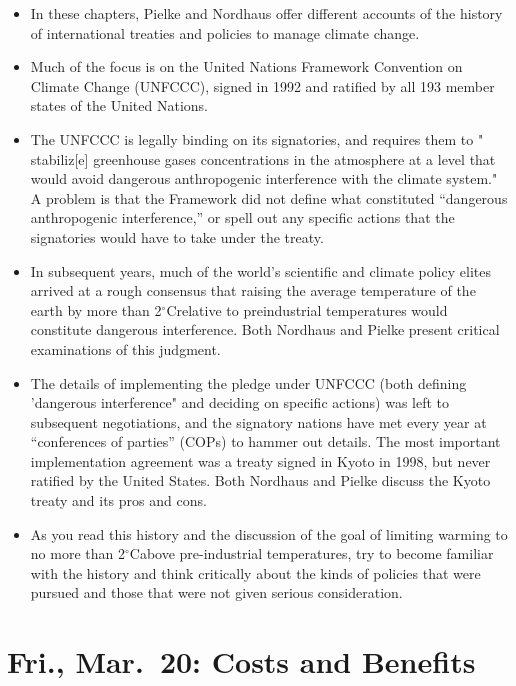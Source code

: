 \documentclass[
]{article}
\providecommand{\tightlist}{%
  \setlength{\itemsep}{0pt}\setlength{\parskip}{0pt}}
\newcommand{\degC}{\ensuremath{^\circ \mathrm{C}}}
\begin{document}
\begin{itemize}
\tightlist
\item
  In these chapters, Pielke and Nordhaus offer different accounts of the
  history of international treaties and policies to manage climate
  change.
\item
  Much of the focus is on the United Nations Framework Convention on
  Climate Change (UNFCCC), signed in 1992 and ratified by all 193 member
  states of the United Nations.
\item
  The UNFCCC is legally binding on its signatories, and requires them to
  " stabiliz{[}e{]} greenhouse gases concentrations in the atmosphere at
  a level that would avoid dangerous anthropogenic interference with the
  climate system." A problem is that the Framework did not define what
  constituted ``dangerous anthropogenic interference,'' or spell out any
  specific actions that the signatories would have to take under the
  treaty.
\item
  In subsequent years, much of the world's scientific and climate policy
  elites arrived at a rough consensus that raising the average
  temperature of the earth by more than 2\degC relative to preindustrial
  temperatures would constitute dangerous interference. Both Nordhaus
  and Pielke present critical examinations of this judgment.
\item
  The details of implementing the pledge under UNFCCC (both defining
  'dangerous interference" and deciding on specific actions) was left to
  subsequent negotiations, and the signatory nations have met every year
  at ``conferences of parties'' (COPs) to hammer out details. The most
  important implementation agreement was a treaty signed in Kyoto in
  1998, but never ratified by the United States. Both Nordhaus and
  Pielke discuss the Kyoto treaty and its pros and cons.
\item
  As you read this history and the discussion of the goal of limiting
  warming to no more than 2\degC above pre-industrial temperatures, try
  to become familiar with the history and think critically about the
  kinds of policies that were pursued and those that were not given
  serious consideration.
\end{itemize}

\hypertarget{fri.-mar.-20-costs-and-benefits}{%
\section{Fri., Mar.~20: Costs and
Benefits}\label{fri.-mar.-20-costs-and-benefits}}
\end{document}
